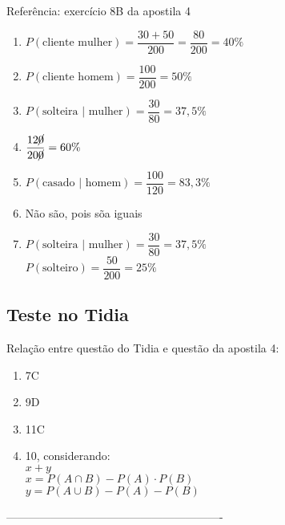 \documentclass[a4paper]{article}
\begin{document}
	Referência: exercício 8B da apostila 4
	
	\begin{enumerate}[label=\alph*.]
		\item $P(\text{cliente mulher}) = \dfrac{30 + 50}{200} = \dfrac{80}{200} = 40\%$
		\item $P(\text{cliente homem}) = \dfrac{100}{200} = 50\%$
		\item $P(\text{solteira }|\text{ mulher}) = \dfrac{30}{80} = 37,5\%$
		\item $\dfrac{12\cancel{0}}{20\cancel{0}} = 60\%$
		\item $P(\text{casado }|\text{ homem}) = \dfrac{100}{120} = 83,3\%$
		\item Não são, pois sõa iguais
		\item $P(\text{solteira }|\text{ mulher}) = \dfrac{30}{80} = 37,5\%$ \\
			$P(\text{solteiro}) = \dfrac{50}{200} = 25\%$\\
	\end{enumerate}

	\subsection{Teste no Tidia}
	
	Relação entre questão do Tidia e questão da apostila 4:
	
	\begin{enumerate}
		\item 7C
		\item 9D
		\item 11C
		\item 10, considerando: \\
			$x+y$ \\
			$x = P(A \cap B) - P(A) \cdot P(B)$ \\
			$y = P(A \cup B) - P(A) - P(B)$
	\end{enumerate}
	
	 ----------------------------------------------------------
	
	
	
		
	
\end{document}
